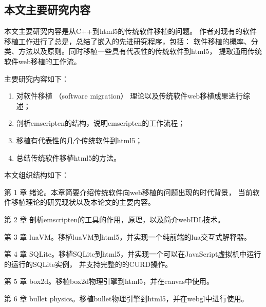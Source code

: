 \subsection{本文主要研究内容}

本文主要研究内容是从C++到html5的传统软件移植的问题。
作者对现有的软件移植工作进行了总是，总结了嵌入的先进研究程序，包括：
软件移植的概率、分类、方法以及原则。同时移植一些具有代表性的传统软件到html5，
提取通用传统软件web移植的工作流。

主要研究内容如下：

\begin{enumerate}
    \item 对软件移植 （software migration） 理论以及传统软件web移植成果进行综述；
    \item 剖析emscripten的结构，说明emscripten的工作流程；
    \item 移植有代表性的几个传统软件到html5；
    \item 总结传统软件移植html5的方法。
\end{enumerate}

本文组织结构如下：

{\heiti 第 1 章 } 绪论。本章简要介绍传统软件向web移植的问题出现的时代背景，
当前软件移植理论的研究现状以及本论文的主要内容。

{\heiti 第 2 章 } 剖析emscripten的工具的作用，原理，以及简介webIDL技术。

{\heiti 第 3 章 } luaVM。移植luaVM到html5，并实现一个纯前端的lua交互式解释器。

{\heiti 第 4 章 } SQLite。移植SQLite到html5，并实现一个可以在JavaScript虚拟机中运行的运行的SQLite实例，
并支持完整的的CURD操作。

{\heiti 第 5 章 } box2d。移植box2d物理引擎到html5，并在canvas中使用。

{\heiti 第 6 章 } bullet physics。移植bullet物理引擎到html5，并在webgl中进行使用。

